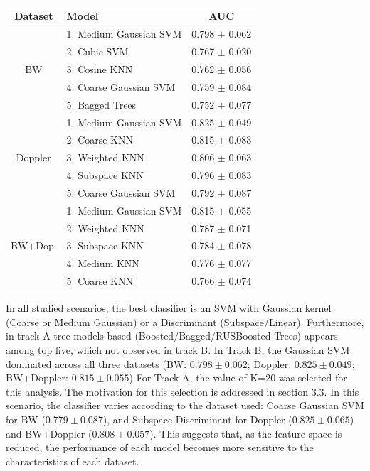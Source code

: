 \documentclass[12pt,a4paper]{article}
\begin{document}
\begin{table}[h]
\begin{minipage}{0.48\textwidth}
        \label{tab:top5-cv-trilha-b}
        \scriptsize
        \setlength{\tabcolsep}{3pt}
        \begin{tabular}{clc}
            \toprule
            \textbf{Dataset} & \textbf{Model} & \textbf{AUC} \\
            \midrule
            \multirow{5}{*}{BW}
                & 1. Medium Gaussian SVM    & 0.798 $\pm$ 0.062 \\
                & 2. Cubic SVM              & 0.767 $\pm$ 0.020 \\
                & 3. Cosine KNN             & 0.762 $\pm$ 0.056 \\
                & 4. Coarse Gaussian SVM    & 0.759 $\pm$ 0.084 \\
                & 5. Bagged Trees           & 0.752 $\pm$ 0.077 \\
            \midrule
            \multirow{5}{*}{Doppler}
                & 1. Medium Gaussian SVM    & 0.825 $\pm$ 0.049 \\
                & 2. Coarse KNN             & 0.815 $\pm$ 0.083 \\
                & 3. Weighted KNN           & 0.806 $\pm$ 0.063 \\
                & 4. Subspace KNN           & 0.796 $\pm$ 0.083 \\
                & 5. Coarse Gaussian SVM    & 0.792 $\pm$ 0.087 \\
            \midrule
            \multirow{5}{*}{BW+Dop.}
                & 1. Medium Gaussian SVM    & 0.815 $\pm$ 0.055 \\
                & 2. Weighted KNN           & 0.787 $\pm$ 0.071 \\
                & 3. Subspace KNN           & 0.784 $\pm$ 0.078 \\
                & 4. Medium KNN             & 0.776 $\pm$ 0.077 \\
                & 5. Coarse KNN             & 0.766 $\pm$ 0.074 \\
            \bottomrule
        \end{tabular}
    \end{minipage}
\end{table}

In all studied scenarios, the best classifier is an SVM with Gaussian kernel (Coarse or Medium Gaussian) or a Discriminant (Subspace/Linear). Furthermore, in track A tree-models based (Boosted/Bagged/RUSBoosted Trees) appears among top five, which not observed in track B. In Track B, the Gaussian SVM dominated across all three datasets (BW: $0.798 \pm 0.062$; Doppler: $0.825 \pm 0.049$; BW+Doppler: $0.815 \pm 0.055$) For Track A, the value of K=20 was selected for this analysis. The motivation for this selection is addressed in section 3.3. In this scenario, the classifier varies according to the dataset used: Coarse Gaussian SVM for BW ($0.779 \pm 0.087$), and Subspace Discriminant for Doppler  ($0.825 \pm 0.065$) and BW+Doppler ($0.808 \pm 0.057$). This suggests that, as the feature space is reduced, the performance of each model becomes more sensitive to the characteristics of each dataset.     
\end{document}
